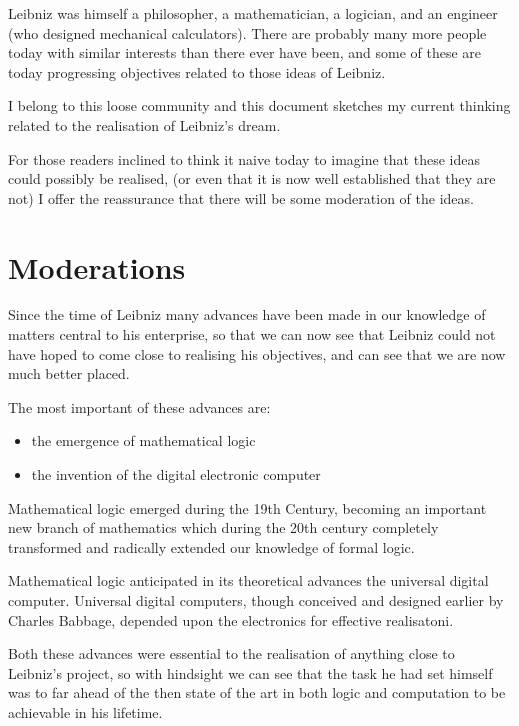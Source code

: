 \documentclass[numreferences]{rbjk}
\begin{document}
\begin{article}
\begin{itemize}
\end{itemize}

Leibniz was himself a philosopher, a mathematician, a logician, and an engineer (who designed mechanical calculators).
There are probably many more people today with similar interests than there ever have been, and some of these are today progressing objectives related to those ideas of Leibniz.

I belong to this loose community and this document sketches my current thinking related to the realisation of Leibniz's dream.

For those readers inclined to think it naive today to imagine that these ideas could possibly be realised, (or even that it is now well established that they are not) I offer the reassurance that there will be some moderation of the ideas.

\section{Moderations}

Since the time of Leibniz many advances have been made in our knowledge of matters central to his enterprise, so that we can now see that Leibniz could not have hoped to come close to realising his objectives, and can see that we are now much better placed.

The most important of these advances are:
\begin{itemize}
\item the emergence of mathematical logic
\item the invention of the digital electronic computer
\end{itemize}

Mathematical logic emerged during the 19th Century, becoming an important new branch of mathematics which during the 20th century completely transformed and radically extended our knowledge of formal logic.

Mathematical logic anticipated in its theoretical advances the universal digital computer.
Universal digital computers, though conceived and designed earlier by Charles Babbage, depended upon the electronics for effective realisatoni.

Both these advances were essential to the realisation of anything close to Leibniz's project, so with hindsight we can see that the task he had set himself was to far ahead of the then state of the art in both logic and computation to be achievable in his lifetime.


\end{article}
\end{document}
